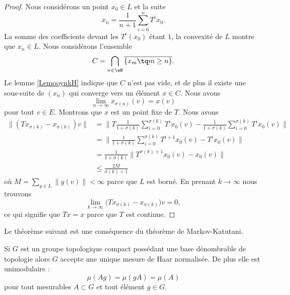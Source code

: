 \begin{proof}
    Nous considérons un point \( x_0\in L\) et la suite
    \begin{equation}
        x_n=\frac{1}{ n+1 }\sum_{i=0}^n T^ix_0.
    \end{equation}
    La somme des coefficients devant les \( T^i(x_0)\) étant \( 1\), la convexité de \( L\) montre que \( x_n\in L\). Nous considérons l'ensemble
    \begin{equation}
        C=\bigcap_{n\in \eN}\overline{ \{ x_m\tq m\geq n \} }.
    \end{equation}
    Le lemme \ref{LemooynkH} indique que \( C\) n'est pas vide, et de plus il existe une sous-suite de \( (x_n)\) qui converge vers un élément \( x\in C\). Nous avons
    \begin{equation}
        \lim_{n\to \infty} x_{\sigma(n)}(v)=x(v)
    \end{equation}
    pour tout \( v\in E\). Montrons que \( x\) est un point fixe de \( T\). Nous avons
    \begin{subequations}
        \begin{align}
            \| (Tx_{\sigma(k)}-x_{\sigma(k)})v \|&=\Big\| T\frac{1}{ 1+\sigma(k) }\sum_{i=0}^{\sigma(k)}T^ix_0(v)-\frac{1}{ 1+\sigma(k) }\sum_{i=0}^{\sigma(k)}T^ix_0(v) \Big\|\\
            &=\Big\| \frac{1}{ 1+\sigma(k) }\sum_{i=0}^{\sigma(k)}T^{i+1}x_0(v)-T^ix_0(v) \Big\|\\
            &=\frac{1}{ 1+\sigma(k) }\big\| T^{\sigma(k)+1}x_0(v)-x_0(v) \big\|\\
            &\leq\frac{ 2M }{ \sigma(k)+1 }
        \end{align}
    \end{subequations}
    où \( M=\sum_{y\in L}\| y(v) \|<\infty\) parce que \( L\) est borné. En prenant \( k\to\infty\) nous trouvons
    \begin{equation}
        \lim_{k\to \infty} \big( Tx_{\sigma(k)}-x_{\sigma(k)} \big)v=0,
    \end{equation}
    ce qui signifie que \( Tx=x\) parce que \( T\) est continue.
\end{proof}

Le théorème suivant est une conséquence du théorème de Markov-Katutani.
\begin{theorem} \label{ThoBZBooOTxqcI}
    Si \( G\) est un groupe topologique compact possédant une base dénombrable de topologie alors \( G\) accepte une unique mesure de Haar normalisée. De plus elle est unimodulaire :
    \begin{equation}
        \mu(Ag)=\mu(gA)=\mu(A)
    \end{equation}
    pour tout mesurables \( A\subset G\) et tout élément \( g\in G\).
\end{theorem}



